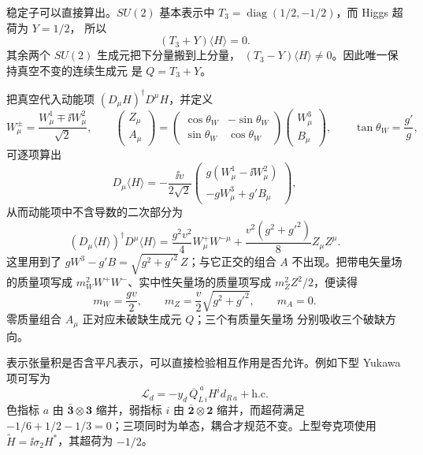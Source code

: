 稳定子可以直接算出。$SU(2)$ 基本表示中
$T_3=\operatorname{diag}(1/2,-1/2)$，而 Higgs 超荷为 $Y=1/2$，
所以
\[
(T_3+Y)\langle H\rangle=0.
\]
其余两个 $SU(2)$ 生成元把下分量搬到上分量，
$(T_3-Y)\langle H\rangle\neq0$。因此唯一保持真空不变的连续生成元
是 $Q=T_3+Y$。

把真空代入动能项 $(D_\mu H)^\dagger D^\mu H$，并定义
\[
W_\mu^\pm=\frac{W_\mu^1\mp\ii W_\mu^2}{\sqrt2},
\qquad
\begin{pmatrix}Z_\mu\\A_\mu\end{pmatrix}
=\begin{pmatrix}\cos\theta_W&-\sin\theta_W\\
\sin\theta_W&\cos\theta_W\end{pmatrix}
\begin{pmatrix}W_\mu^3\\B_\mu\end{pmatrix},
\qquad \tan\theta_W=\frac{g'}g,
\]
可逐项算出
\[
D_\mu\langle H\rangle
=-\frac{\ii v}{2\sqrt2}
\begin{pmatrix}
g(W_\mu^1-\ii W_\mu^2)\\-gW_\mu^3+g'B_\mu
\end{pmatrix},
\]
从而动能项中不含导数的二次部分为
\begin{equation}
(D_\mu\langle H\rangle)^\dagger D^\mu\langle H\rangle
=\frac{g^2v^2}{4}W_\mu^+W^{-\mu}
+\frac{v^2(g^2+g'^2)}8 Z_\mu Z^\mu.
\label{eq:higgs-gauge-mass-terms}
\end{equation}
这里用到了 $gW^3-g'B=\sqrt{g^2+g'^2}\,Z$；与它正交的组合 $A$ 不出现。把带电矢量场的质量项写成 $m_W^2W^+W^-$、实中性矢量场的质量项写成 $m_Z^2Z^2/2$，便读得
\[
m_W=\frac{gv}{2},\qquad
m_Z=\frac{v}{2}\sqrt{g^2+g'^2},\qquad
m_A=0.
\]
零质量组合 $A_\mu$ 正对应未破缺生成元 $Q$；三个有质量矢量场
分别吸收三个破缺方向。

表示张量积是否含平凡表示，可以直接检验相互作用是否允许。例如下型 Yukawa 项可写为
\[
\mathcal L_d=-y_d\,\overline Q_{L\,i}^{\ a}H^i d_{R\,a}+\mathrm{h.c.}
\]
色指标 $a$ 由 $\bar{\mathbf3}\otimes\mathbf3$ 缩并，弱指标 $i$ 由 $\bar{\mathbf2}\otimes\mathbf2$ 缩并，而超荷满足 $-1/6+1/2-1/3=0$；三项同时为单态，耦合才规范不变。上型夸克项使用 $\widetilde H=\ii\sigma_2H^*$，其超荷为 $-1/2$。

